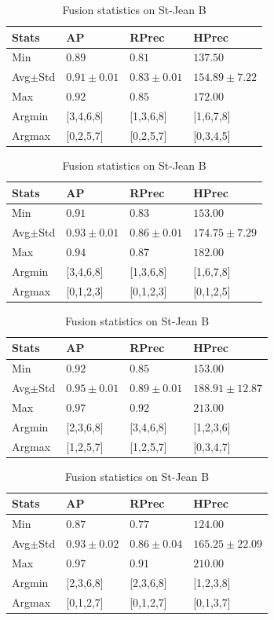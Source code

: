 \begin{table}
  \centering
  \caption{Fusion statistics on St-Jean B}
  \label{tab:fusion_stats_B}

  \begin{tabular}{l l l l}
    \toprule
    Stats
    & AP
    & RPrec
    & HPrec \\
    \midrule
    Min & $0.89$ & $0.81$ & $137.50$ \\
    Avg$\pm$Std & $0.91\pm0.01$ & $0.83\pm0.01$ & $154.89\pm7.22$ \\
    Max & $0.92$ & $0.85$ & $172.00$ \\
    Argmin & [3,4,6,8] & [1,3,6,8] & [1,6,7,8] \\
    Argmax & [0,2,5,7] & [0,2,5,7] & [0,3,4,5] \\
    \bottomrule
  \end{tabular}

  \begin{tabular}{l l l l}
    \toprule
    Stats
    & AP
    & RPrec
    & HPrec \\
    \midrule
    Min & $0.91$ & $0.83$ & $153.00$ \\
    Avg$\pm$Std & $0.93\pm0.01$ & $0.86\pm0.01$ & $174.75\pm7.29$ \\
    Max & $0.94$ & $0.87$ & $182.00$ \\
    Argmin & [3,4,6,8] & [1,3,6,8] & [1,6,7,8] \\
    Argmax & [0,1,2,3] & [0,1,2,3] & [0,1,2,5] \\
    \bottomrule
  \end{tabular}

  \begin{tabular}{l l l l}
    \toprule
    Stats
    & AP
    & RPrec
    & HPrec \\
    \midrule
    Min & $0.92$ & $0.85$ & $153.00$ \\
    Avg$\pm$Std & $0.95\pm0.01$ & $0.89\pm0.01$ & $188.91\pm12.87$ \\
    Max & $0.97$ & $0.92$ & $213.00$ \\
    Argmin & [2,3,6,8] & [3,4,6,8] & [1,2,3,6] \\
    Argmax & [1,2,5,7] & [1,2,5,7] & [0,3,4,7] \\
    \bottomrule
  \end{tabular}

  \begin{tabular}{l l l l}
    \toprule
    Stats
    & AP
    & RPrec
    & HPrec \\
    \midrule
    Min & $0.87$ & $0.77$ & $124.00$ \\
    Avg$\pm$Std & $0.93\pm0.02$ & $0.86\pm0.04$ & $165.25\pm22.09$ \\
    Max & $0.97$ & $0.91$ & $210.00$ \\
    Argmin & [2,3,6,8] & [2,3,6,8] & [1,2,3,8] \\
    Argmax & [0,1,2,7] & [0,1,2,7] & [0,1,3,7] \\
    \bottomrule
  \end{tabular}
\end{table}

